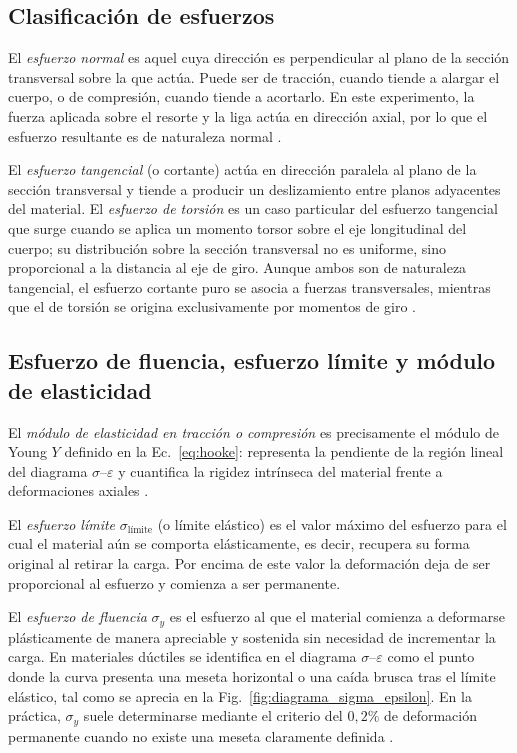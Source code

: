 \subsection{Clasificación de esfuerzos}

El \textit{esfuerzo normal} es aquel cuya dirección es perpendicular al plano de la
sección transversal sobre la que actúa. Puede ser de tracción, cuando tiende a alargar
el cuerpo, o de compresión, cuando tiende a acortarlo. En este experimento, la fuerza
aplicada sobre el resorte y la liga actúa en dirección axial, por lo que el esfuerzo
resultante es de naturaleza normal \cite{halliday}.

El \textit{esfuerzo tangencial} (o cortante) actúa en dirección paralela al plano de la
sección transversal y tiende a producir un deslizamiento entre planos adyacentes del
material. El \textit{esfuerzo de torsión} es un caso particular del esfuerzo tangencial
que surge cuando se aplica un momento torsor sobre el eje longitudinal del cuerpo;
su distribución sobre la sección transversal no es uniforme, sino proporcional a la
distancia al eje de giro. Aunque ambos son de naturaleza tangencial, el esfuerzo
cortante puro se asocia a fuerzas transversales, mientras que el de torsión se origina
exclusivamente por momentos de giro \cite{serway}.

\subsection{Esfuerzo de fluencia, esfuerzo límite y módulo de elasticidad}

El \textit{módulo de elasticidad en tracción o compresión} es precisamente el módulo de
Young $Y$ definido en la Ec.~\eqref{eq:hooke}: representa la pendiente de la región
lineal del diagrama $\sigma$--$\varepsilon$ y cuantifica la rigidez intrínseca del
material frente a deformaciones axiales \cite{halliday}.

El \textit{esfuerzo límite} $\sigma_{\text{límite}}$ (o límite elástico) es el valor
máximo del esfuerzo para el cual el material aún se comporta elásticamente, es decir,
recupera su forma original al retirar la carga. Por encima de este valor la deformación
deja de ser proporcional al esfuerzo y comienza a ser permanente.

El \textit{esfuerzo de fluencia} $\sigma_y$ es el esfuerzo al que el material comienza
a deformarse plásticamente de manera apreciable y sostenida sin necesidad de incrementar
la carga. En materiales dúctiles se identifica en el diagrama $\sigma$--$\varepsilon$
como el punto donde la curva presenta una meseta horizontal o una caída brusca tras el
límite elástico, tal como se aprecia en la Fig.~\ref{fig:diagrama_sigma_epsilon}. En la
práctica, $\sigma_y$ suele determinarse mediante el criterio del $0{,}2\%$ de
deformación permanente cuando no existe una meseta claramente definida \cite{serway}.